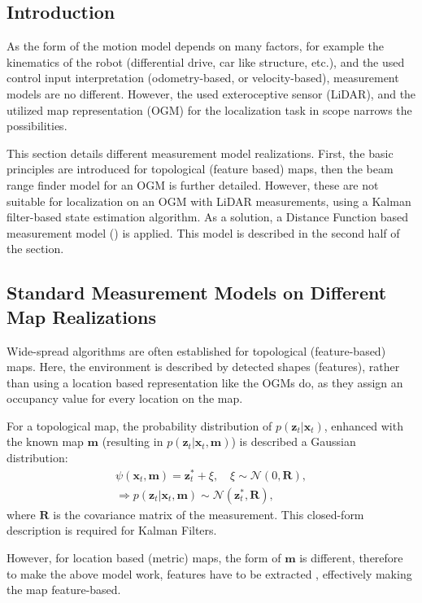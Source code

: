 \subsection{Introduction}
As the form of the motion model depends on many factors, for example the kinematics of the robot
(differential drive, car like structure, etc.), and the used control input interpretation
(odometry-based, or velocity-based), measurement models are no different.
However, the used exteroceptive sensor (LiDAR), and the utilized map representation (OGM)
for the localization task in scope narrows the possibilities.

This section details different measurement model realizations.
First, the basic principles are introduced for topological (feature based) maps,
then the beam range finder model for an OGM is further detailed.
However, these are not suitable for localization on an OGM with LiDAR measurements,
using a Kalman filter-based state estimation algorithm.
As a solution, a Distance Function based measurement model  (\cite{Dantanarayana2013})
is applied. This model is described in the second half of the section.

\subsection{Standard Measurement Models on Different Map Realizations}
Wide-spread algorithms are often established for topological (feature-based) maps.
Here, the environment is described by detected shapes (features), rather than using a location based representation
like the OGMs do, as they assign an occupancy value for every location on the map.

For a topological map, the probability distribution of $p(\mathbf{\mathbf{z}}_t | \mathbf{x}_t)$,
enhanced with the known map $\mathbf{m}$ (resulting in $p(\mathbf{\mathbf{z}}_t | \mathbf{x}_t,\mathbf{m})$)
is described a Gaussian distribution:
\begin{align}
    \psi(\mathbf{x}_t,\mathbf{m}) = \mathbf{z}^*_t + \xi, \quad \xi \sim \mathcal{N}(0,\mathbf{R}), \\
    \Rightarrow p(\mathbf{\mathbf{z}}_t | \mathbf{x}_t,\mathbf{m}) \sim \mathcal{N}(\mathbf{z}_t^*,\mathbf{R}),
\end{align}
where $\mathbf{R}$ is the covariance matrix of the measurement.
This closed-form description is required for Kalman Filters.

However, for location based (metric) maps, the form of $\mathbf{m}$ is different, therefore
to make the above model work, features have to be extracted \cite{Durrant-Whyte1991},
effectively making the map feature-based.

